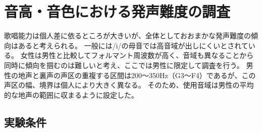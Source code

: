 \documentclass[10.5ptj,a4j,dvipdfmx,uplatex, oneside, openany, report]{jsbook}%
\begin{document}


\chapter{音高・音色における発声難度の調査}

歌唱能力は個人差に依るところが大きいが、全体としておおまかな発声難度の傾向はあると考えられる。
一般には/i/の母音では高音域が出しにくいとされている。
女性は男性と比較してフォルマント周波数が高く、音域も異なることから同時に傾向を掴むのは難しいと考え、ここでは男性に限定して調査を行う。
男性の地声と裏声の声区の重複する区間は200〜350Hz（G3〜F4）であるが、この声区の幅、境界は個人により大きく異なる。
そのため、使用音域は男性の平均的な地声の範囲に収まるように設定した。

\section{実験条件}
\end{document}
